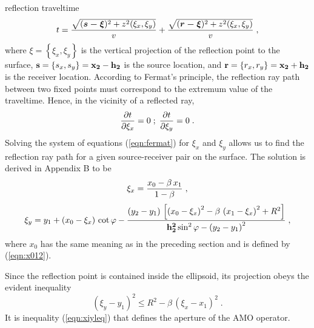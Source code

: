 reflection traveltime 
\begin{equation}
t={\sqrt{
(\mbox{\boldmath{$s - \xi$}})^2+z^2(\xi_x,\xi_y)}
\over v}+
{\sqrt{
(\mbox{\boldmath{$r - \xi$}})^2+z^2(\xi_x,\xi_y)}
\over v}\;,
\label{eqn:reflecttt}
\end{equation}  
where \boldmath$\xi=$\unboldmath$\left\{\xi_x,\xi_y\right\}$ is the vertical
projection of the reflection 
point to the surface, ${\bf s}=\left\{s_x,s_y\right\}={\bf x_2-h_2}$
is the source location, and 
${\bf r}=\left\{r_x,r_y\right\}={\bf x_2+h_2}$ is the receiver location.
According to Fermat's principle, the reflection ray path between two
fixed points must correspond to the
extremum value of the traveltime. Hence, in the vicinity of a
reflected ray,
\begin{equation}
{\partial t \over \partial \xi_x}=0\;;\;
{\partial t \over \partial \xi_y}=0\;.
\label{eqn:fermat}
\end{equation}   
Solving the system of equations (\ref{eqn:fermat}) for $\xi_x$ and $\xi_y$
allows us to find the reflection ray path for a given source-receiver
pair on the surface. The solution is derived in Appendix B to be
\begin{equation}
\xi_x={{x_0-\beta\,x_1}\over{1-\beta}}\;,
\label{eqn:x02xi}
\end{equation} 
\begin{equation}
\xi_y=y_1+\left(x_0-\xi_x\right)\,\cot{\varphi}-
{{\left(y_2-y_1\right)\,\left[
\left(x_0-\xi_x\right)^2-\beta\,\left(x_1-\xi_x\right)^2+R^2
\right]}\over
{{\bf h_2^2}\sin^2{\varphi}-\left(y_2-y_1\right)^2}}\;,
\label{eqn:xiy}
\end{equation} 
where $x_0$ has the same meaning as in the preceding section
and is defined by (\ref{eqn:x012}).
\par
Since the reflection point is contained inside the ellipsoid,
its projection obeys the evident inequality
\begin{equation}
\left(\xi_y-y_1\right)^2\leq R^2-\beta\,\left(\xi_x-x_1\right)^2\;.
\label{eqn:xiyleq}
\end{equation}
It is inequality (\ref{eqn:xiyleq}) that defines the aperture of the AMO
operator.

